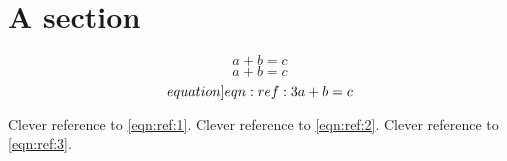 \documentclass{article}
\begin{document}
\section{A section}

\begin{equation}\label{eqn:ref:1}
a + b = c
\end{equation}
\begin{dmath}\label{eqn:ref:2}
a + b = c
\end{dmath}
\begin{dmath}\label[equation]{eqn:ref:3}
a + b = c
\end{dmath}

Clever reference to \cref{eqn:ref:1}.
Clever reference to \cref{eqn:ref:2}.
Clever reference to \cref{eqn:ref:3}.
\end{document}
